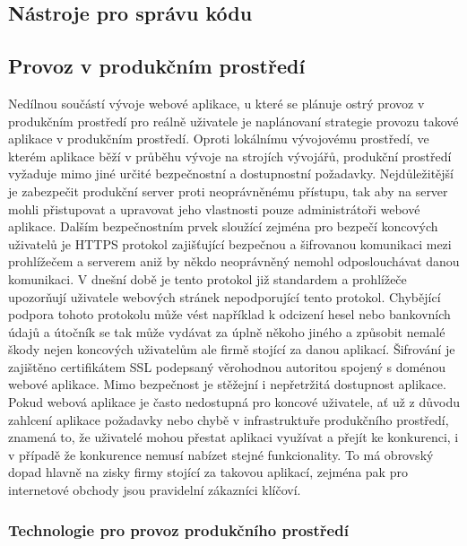 \begin{itemize}
\begin{itemize}
	\subsection{Nástroje pro správu kódu}


	\subsection{Provoz v produkčním prostředí}

	Nedílnou součástí vývoje webové aplikace, u které se plánuje ostrý provoz v produkčním prostředí pro reálně uživatele
	je naplánovaní strategie provozu takové aplikace v produkčním prostředí.
	Oproti lokálnímu vývojovému prostředí, ve kterém aplikace běží v průběhu vývoje na strojích vývojářů, produkční
	prostředí vyžaduje mimo jiné určité bezpečnostní a dostupnostní požadavky.
	Nejdůležitější je zabezpečit produkční server proti neoprávněnému přístupu, tak aby na server mohli přistupovat a
	upravovat jeho vlastnosti pouze administrátoři webové aplikace.
	Dalším bezpečnostním prvek sloužící zejména pro bezpečí koncových uživatelů je HTTPS protokol zajišťující bezpečnou
	a šifrovanou komunikaci mezi prohlížečem a serverem aniž by někdo neoprávněný nemohl odposlouchávat danou komunikaci.
	V dnešní době je tento protokol již standardem a prohlížeče upozorňují uživatele webových stránek nepodporující tento
	protokol.
	Chybějící podpora tohoto protokolu může vést například k odcizení hesel nebo bankovních údajů a útočník se tak
	může vydávat za úplně někoho jiného a způsobit nemalé škody nejen koncových uživatelům ale firmě stojící za danou
	aplikací.
	Šifrování je zajištěno certifikátem SSL podepsaný věrohodnou autoritou spojený s doménou webové aplikace.
	Mimo bezpečnost je stěžejní i nepřetržitá dostupnost aplikace.
	Pokud webová aplikace je často nedostupná pro koncové uživatele, ať už z důvodu zahlcení aplikace požadavky nebo
	chybě v infrastruktuře produkčního prostředí, znamená to, že uživatelé mohou přestat aplikaci využívat a přejít
	ke konkurenci, i v případě že konkurence nemusí nabízet stejné funkcionality.
	To má obrovský dopad hlavně na zisky firmy stojící za takovou aplikací, zejména pak pro internetové obchody jsou
	pravidelní zákazníci klíčoví.

		\subsubsection{Technologie pro provoz produkčního prostředí}


\end{itemize}
\end{itemize}
